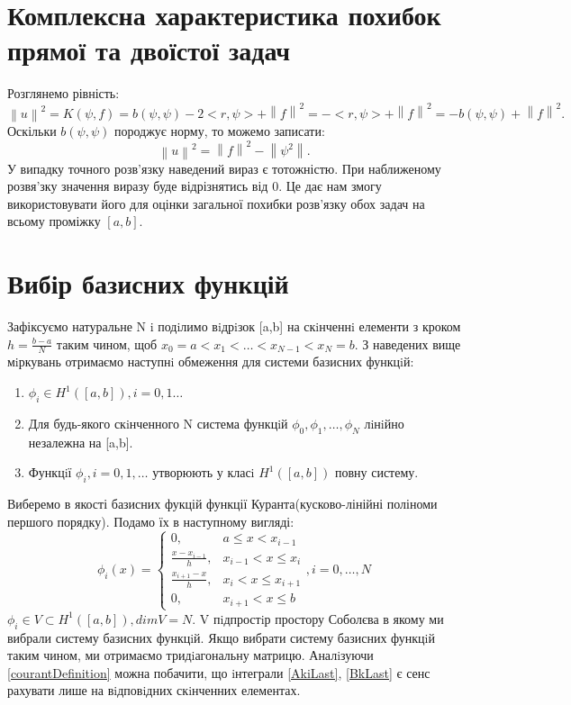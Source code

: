 \documentclass[a4paper]{article}
\newcommand\norm[1]{\left\lVert#1\right\rVert}
\numberwithin{equation}{section}
\begin{document}
\section{Комплексна характеристика похибок прямої та двоїстої задач}
Розглянемо рівність:
\begin{equation}
\norm{u} ^ 2 = K(\psi, f) = b(\psi, \psi) - 2<r, \psi> + \norm{f}^2 = - <r,\psi> + \norm{f}^2 = -b(\psi, \psi) + \norm{f}^2.
\end{equation}
Оскільки $b(\psi, \psi)$ породжує норму, то можемо записати:
\begin{equation}\label{complexError}
\norm{u}^2 = \norm{f}^2 - \norm{\psi^2}.
\end{equation}
У випадку точного розв'язку наведений вираз є тотожністю. При наближеному розвя'зку значення виразу буде відрізнятись від 0. Це дає нам змогу використовувати його для оцінки загальної похибки розв'язку обох задач на всьому проміжку $[a,b]$.

\section{Вибір базисних функцій}
Зафіксуємо натуральне N i подiлимо вiдрiзок [a,b] на скiнченнi елементи з кроком $h=\frac{b-a}{N}$ таким чином, щоб $x_0 = a < x_1 < \ldots < x_{N-1} < x_N = b$. З наведених вище мiркувань отримаємо наступнi обмеження для системи базисних функцiй:
\begin{enumerate}
\item $\phi_i \in H^1([a, b]), i = 0, 1\ldots$
\item Для будь-якого скiнченного N система функцiй $\phi_0, \phi_1, \ldots, \phi_N$ лiнiйно незалежна на [a,b].
\item Функцiї $\phi_i, i=0,1,\ldots $ утворюють у класi $H^1([a, b])$ повну систему.
\end{enumerate}
Виберемо в якості базисних фукцій функції Куранта(кусково-лінійні поліноми першого порядку). Подамо їх в наступному вигляді:
\begin{equation}\label{courantDefinition}
\phi_i(x)=
\begin{cases} 
0, & a\leq x < x_{i-1}\\ \frac{x-x_{i-1}}{h}, & x_{i-1} < x \leq x_i\\ 
\frac{x_{i+1} - x}{h}, & x_i < x \leq x_{i+1} \\
0, & x_{i+1} < x \leq b
\end{cases}
,i=0,\ldots,N
\end{equation}
$\phi_i \in V \subset H^1([a, b]), dimV = N$. V пiдпростiр простору Соболєва в якому ми вибрали систему базисних функцiй. Якщо вибрати систему базисних функцiй таким чином, ми отримаємо тридiа\-гональну матрицю. Аналiзуючи \ref{courantDefinition} можна побачити, що iнтеграли \ref{AkiLast}, \ref{BkLast} є сенс рахувати лише на вiдповiдних скiнченних елементах.
\end{document}
